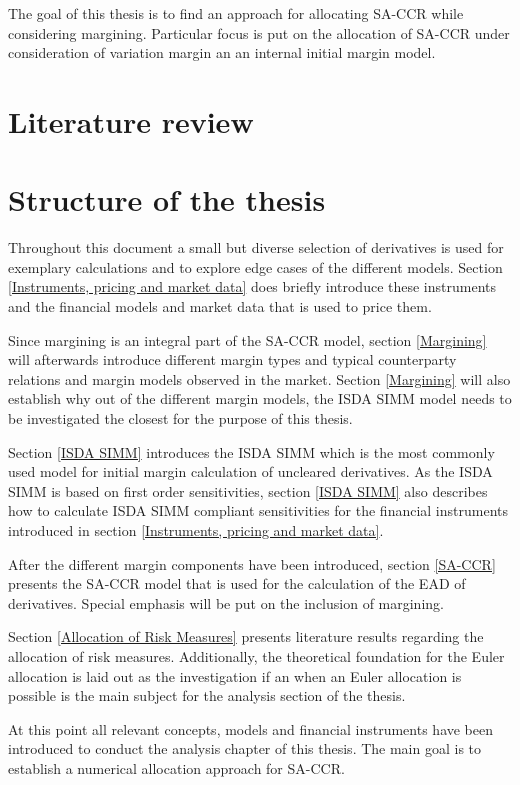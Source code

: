 \documentclass[../Thesis_AHoecherl.tex]{subfiles}
\begin{document}
    The goal of this thesis is to find an approach for allocating SA-CCR while considering margining. Particular focus is put on the allocation of SA-CCR under consideration of variation margin an an internal initial margin model. 
    
    \section{Literature review}
    \section{Structure of the thesis}

    Throughout this document a small but diverse selection of derivatives is used for exemplary calculations and to explore edge cases of the different models. Section \ref{Instruments, pricing and market data} does briefly introduce these instruments and the financial models and market data that is used to price them.
    
    Since margining is an integral part of the \gls{SA-CCR} model, section \ref{Margining} will afterwards introduce different margin types and typical counterparty relations and margin models observed in the market. Section \ref{Margining} will also establish why out of the different margin models, the \gls{ISDA SIMM} model needs to be investigated the closest for the purpose of this thesis.

    Section \ref{ISDA SIMM} introduces the ISDA SIMM which is the most commonly used model for initial margin calculation of uncleared derivatives. As the ISDA SIMM is based on first order sensitivities, section \ref{ISDA SIMM} also describes how to calculate \gls{ISDA SIMM} compliant sensitivities for the financial instruments introduced in section \ref{Instruments, pricing and market data}.

    After the different margin components have been introduced, section \ref{SA-CCR} presents the SA-CCR model that is used for the calculation of the \gls{EAD} of derivatives. Special emphasis will be put on the inclusion of margining.

    Section \ref{Allocation of Risk Measures} presents literature results regarding the allocation of risk measures. Additionally, the theoretical foundation for the Euler allocation is laid out as the investigation if an when an Euler allocation is possible is the main subject for the analysis section of the thesis.

    At this point all relevant concepts, models and financial instruments have been introduced to conduct the analysis chapter of this thesis. The main goal is to establish a numerical allocation approach for SA-CCR.
\end{document}
